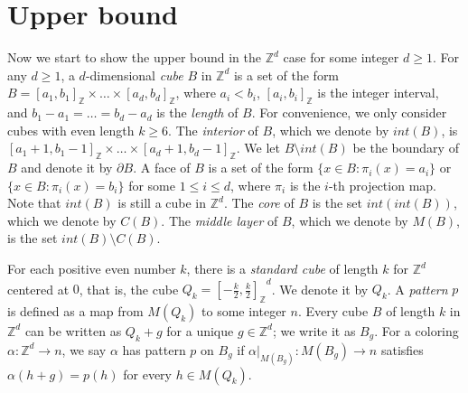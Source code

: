 \documentclass[11pt, reqno, a4paper]{amsart}
\theoremstyle{plain}
\theoremstyle{definition}
\theoremstyle{remark}
\begin{document}
\section{Upper bound}
  Now we start to show the upper bound in the $\mathbb{Z}^d$ case for some integer $d\ge 1$. For any $d\ge 1$, a $d$-dimensional \textit{cube} $B$ in $\mathbb{Z}^d$ is a set of the form $B=[a_1,b_1]_\mathbb{Z}\times\dots\times [a_d,b_d]_\mathbb{Z}$, where $a_i<b_i$, $[a_i,b_i]_\mathbb{Z}$ is the integer interval,   and $b_1-a_1=\dots=b_d-a_d$ is the \textit{length} of $B$. For convenience, we only consider cubes with even length $k\ge 6$. The \textit{interior} of $B$, which we denote by $int(B)$, is $[a_1+1,b_1-1]_\mathbb{Z}\times\dots\times [a_d+1,b_d-1]_\mathbb{Z}$. We let $B\setminus int(B)$ be the boundary of $B$ and denote it by $\partial B$. A face of $B$ is a set of the form $\{x\in B:\pi_i(x)=a_i\}$ or $\{x\in B:\pi_i(x)=b_i\}$ for some $1\le i \le d$, where $\pi_i$ is the $i$-th projection map.
 Note that $int(B)$ is still a cube in $\mathbb{Z}^d$. 
 The \textit{core} of $B$ is the set $int(int(B))$, which we denote by $C(B)$. The \textit{middle layer} of $B$, which we denote by $M(B)$, is the set $int (B)\setminus C(B)$.

 For each positive even number $k$, there is a \textit{standard cube} of length $k$ for $\mathbb{Z}^d$ centered at $0$, that is, the cube $Q_k={[-\frac{k}{2},\frac{k}{2}]_\mathbb{Z}}^d$. We denote it by $Q_k$. A \textit{pattern} $p$ is defined as a map from $M(Q_k)$ to some integer $n$.  Every cube $B$ of length $k$ in $\mathbb{Z}^d$ can be written as $Q_k+g$ for a unique $g\in \mathbb{Z}^d$; we write it as $B_g$.  For a coloring $\alpha:\mathbb{Z}^d\longrightarrow n$, we say $\alpha$ has pattern $p$ on $B_g$ if $\alpha|_{M(B_g)}:M(B_g)\longrightarrow n$ satisfies $\alpha(h+g)=p(h)$ for every $h\in M(Q_k)$.
 
\end{document}
